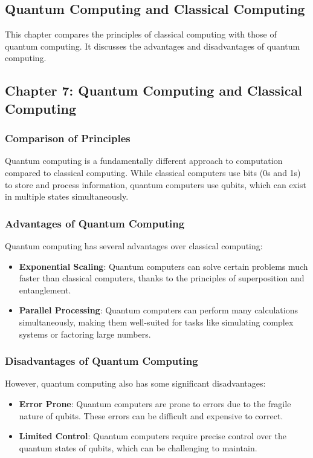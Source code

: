 \documentclass{report}%
\begin{document}
\begin{itemize}
\chapter{Quantum Computing and Classical Computing}%
This chapter compares the principles of classical computing with those of quantum computing. It discusses the advantages and disadvantages of quantum computing.

%
\section{Chapter 7: Quantum Computing and Classical Computing}

\subsection{Comparison of Principles}

Quantum computing is a fundamentally different approach to computation compared to classical computing. While classical computers use bits (0s and 1s) to store and process information, quantum computers use qubits, which can exist in multiple states simultaneously.

\subsection{Advantages of Quantum Computing}

Quantum computing has several advantages over classical computing:

\begin{itemize}
\item \textbf{Exponential Scaling}: Quantum computers can solve certain problems much faster than classical computers, thanks to the principles of superposition and entanglement.
\item \textbf{Parallel Processing}: Quantum computers can perform many calculations simultaneously, making them well-suited for tasks like simulating complex systems or factoring large numbers.
\end{itemize}

\subsection{Disadvantages of Quantum Computing}

However, quantum computing also has some significant disadvantages:

\begin{itemize}
\item \textbf{Error Prone}: Quantum computers are prone to errors due to the fragile nature of qubits. These errors can be difficult and expensive to correct.
\item \textbf{Limited Control}: Quantum computers require precise control over the quantum states of qubits, which can be challenging to maintain.
\end{itemize}


\end{itemize}
\end{document}
